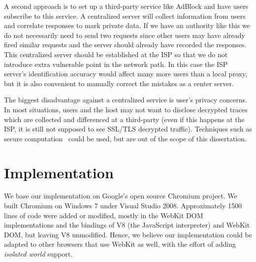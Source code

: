 A second approach is to set up a third-party service like AdBlock and have users subscribe to this service.  A centralized server will collect information from users and correlate responses to mark private data.  If we have an authority like this we do not necessarily need to send two requests since other users may have already fired similar requests and the server should already have recorded the responses.  This centralized server should be established at the ISP so that we do not introduce extra vulnerable point in the network path.  In this case the ISP server's identification accuracy would affect many more users than a local proxy, but it is also convenient to manually correct the mistakes as a center server.  

The biggest disadvantage against a centralized service is user's privacy concerns.  In most situations, users and the host may not want to disclose decrypted traces which are collected and differenced at a third-party (even if this happens at the ISP, it is still not supposed to see SSL/TLS decrypted traffic).  Techniques such as secure computation~\cite{Yao:1986:GES:1382439.1382944,Huang:2011:FST:2028067.2028102} could be used, but are out of the scope of this dissertation.

\section{Implementation}
\label{sec:esorics_impl}

We base our implementation on Google's open source Chromium project.  We built Chromium on Windows 7 under Visual Studio 2008.  Approximately 1500 lines of code were added or modified, mostly in the WebKit DOM implementations and the bindings of V8 (the JavaScript interpreter) and WebKit DOM, but leaving V8 unmodified.  Hence, we believe our implementation could be adapted to other browsers that use WebKit as well, with the effort of adding \emph{isolated world} support.   

